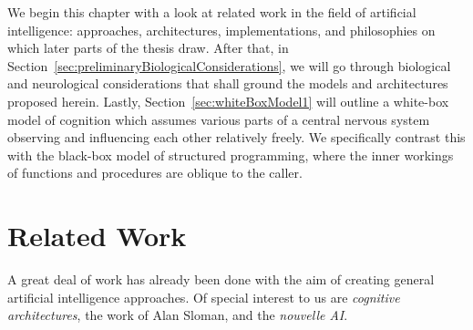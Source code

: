 We begin this chapter with a look at related work in the field of artificial intelligence: approaches, architectures, implementations, and philosophies on which later parts of the thesis draw. After that, in Section~\ref{sec:preliminaryBiologicalConsiderations}, we will go through biological and neurological considerations that shall ground the models and architectures proposed herein. Lastly, Section~\ref{sec:whiteBoxModel1} will outline a white-box model of cognition which assumes various parts of a central nervous system observing and influencing each other relatively freely. We specifically contrast this with the black-box model of structured programming, where the inner workings of functions and procedures are oblique to the caller.

\section{Related Work}\label{sec:relatedWork}

A great deal of work has already been done with the aim of creating general artificial intelligence approaches. Of special interest to us are \emph{cognitive architectures}, the work of Alan Sloman, and the \emph{nouvelle AI}.

